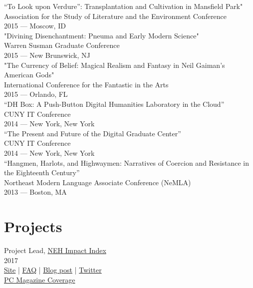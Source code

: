\documentclass[11pt]{article}
\begin{document}
“To Look upon Verdure”: Transplantation and Cultivation in Mansfield Park"\\
Association for the Study of Literature and the Environment Conference\\
2015 — Moscow, ID\\

"Divining Disenchantment: Pneuma and Early Modern Science"\\
Warren Susman Graduate Conference\\
2015 — New Brunswick, NJ\\

"The Currency of Belief: Magical Realism and Fantasy in Neil Gaiman’s American Gods"\\
International Conference for the Fantastic in the Arts\\
2015 — Orlando, FL\\

“DH Box: A Push-Button Digital Humanities Laboratory in the Cloud”\\
CUNY IT Conference\\
2014 — New York, New York\\

“The Present and Future of the Digital Graduate Center”\\
CUNY IT Conference\\
2014 — New York, New York\\

“Hangmen, Harlots, and Highwaymen: Narratives of Coercion and Resistance in the Eighteenth Century”\\
Northeast Modern Language Associate Conference (NeMLA)\\
2013 — Boston, MA\\

\section*{Projects}
\label{sec:orgheadline8}
Project Lead, \href{http://www.nehimpact.org/}{NEH Impact Index}\\
2017\\
\href{http://www.nehimpact.org/}{Site} | \href{http://www.nehimpact.org/faq}{FAQ} | \href{https://digitalfellows.commons.gc.cuny.edu/2017/04/10/exploring-the-local-impact-of-the-neh-neh-impact-index/}{Blog post} | \href{https://twitter.com/psmyth01/status/851505002900336644}{Twitter}\\
\href{http://www.pcmag.com/commentary/353904/trump-budget-slashes-neh-funding-why-you-should-care}{PC Magazine Coverage}\\
\end{document}
